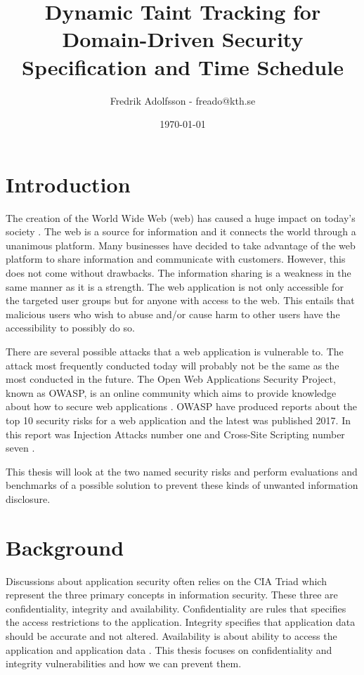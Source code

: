 \documentclass{../kththesis}
\title{Dynamic Taint Tracking for Domain-Driven Security \\
					\large Specification and Time Schedule}
\author{Fredrik Adolfsson - freado@kth.se}
\date{\today}
\begin{document}
	
	\frontmatter
	
	
	
	\titlepage
	
	
	\tableofcontents
	
	
	\mainmatter
	
	
	
	\chapter{Introduction}
	The creation of the World Wide Web (web) has caused a huge impact on today's society \parencite{www}. The web is a source for information and it connects the world through a unanimous platform. Many businesses have decided to take advantage of the web platform to share information and communicate with customers. However, this does not come without drawbacks. The information sharing is a weakness in the same manner as it is a strength. The web application is not only accessible for the targeted user groups but for anyone with access to the web. This entails that malicious users who wish to abuse and/or cause harm to other users have the accessibility to possibly do so. 
	
	There are several possible attacks that a web application is vulnerable to. The attack most frequently conducted today will probably not be the same as the most conducted in the future. The Open Web Applications Security Project, known as OWASP, is an online community which aims to provide knowledge about how to secure web applications \parencite{OpenWebApplicationSecurityProject}. OWASP have produced reports about the top 10 security risks for a web application and the latest was published 2017. In this report was Injection Attacks number one and Cross-Site Scripting number seven \parencite{OWASP2017, OpenWebApplicationSecurityProject, CrossMichael2007Dgtw}.
	
	This thesis will look at the two named security risks and perform evaluations and benchmarks of a possible solution to prevent these kinds of unwanted information disclosure. 
	
	
	
	\chapter{Background}
	Discussions about application security often relies on the CIA Triad which represent the three primary concepts in information security. These three are confidentiality, integrity and availability. Confidentiality are rules that specifies the access restrictions to the application. Integrity specifies that application data should be accurate and not altered. Availability is about ability to access the application and application data \parencite{2014C1-W}. This thesis focuses on confidentiality and integrity vulnerabilities and how we can prevent them.
	
\end{document}
